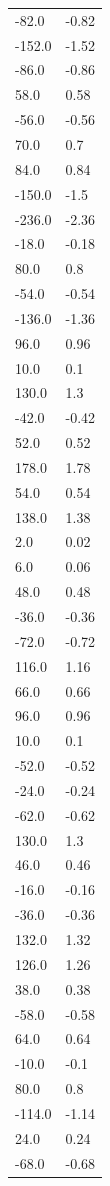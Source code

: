 \begin{longtable}{ll}
-82.0 & -0.82 \\
-152.0 & -1.52 \\
-86.0 & -0.86 \\
58.0 & 0.58 \\
-56.0 & -0.56 \\
70.0 & 0.7 \\
84.0 & 0.84 \\
-150.0 & -1.5 \\
-236.0 & -2.36 \\
-18.0 & -0.18 \\
80.0 & 0.8 \\
-54.0 & -0.54 \\
-136.0 & -1.36 \\
96.0 & 0.96 \\
10.0 & 0.1 \\
130.0 & 1.3 \\
-42.0 & -0.42 \\
52.0 & 0.52 \\
178.0 & 1.78 \\
54.0 & 0.54 \\
138.0 & 1.38 \\
2.0 & 0.02 \\
6.0 & 0.06 \\
48.0 & 0.48 \\
-36.0 & -0.36 \\
-72.0 & -0.72 \\
116.0 & 1.16 \\
66.0 & 0.66 \\
96.0 & 0.96 \\
10.0 & 0.1 \\
-52.0 & -0.52 \\
-24.0 & -0.24 \\
-62.0 & -0.62 \\
130.0 & 1.3 \\
46.0 & 0.46 \\
-16.0 & -0.16 \\
-36.0 & -0.36 \\
132.0 & 1.32 \\
126.0 & 1.26 \\
38.0 & 0.38 \\
-58.0 & -0.58 \\
64.0 & 0.64 \\
-10.0 & -0.1 \\
80.0 & 0.8 \\
-114.0 & -1.14 \\
24.0 & 0.24 \\
-68.0 & -0.68 \\

\end{longtable}
